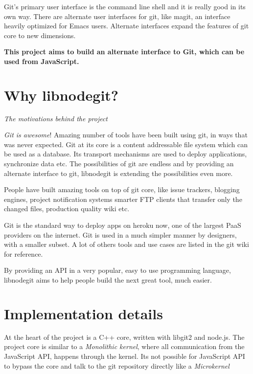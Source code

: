 Git's primary user interface is the command line shell and it is really good in
its own way. There are alternate user interfaces for git, like
magit\cite{magit}, an interface heavily optimized for Emacs\cite{emacs} users.
Alternate interfaces expand the features of git core to new dimensions.

\textbf{This project aims to build an alternate interface to Git, which can be
  used from JavaScript.}

\section{Why libnodegit?}

\newcommand\sectionTitle[1]{\begin{flushright}\textit{#1}\end{flushright}}
\sectionTitle{The motivations behind the project}

\textit{Git is awesome}! Amazing number of tools have been built using
git, in ways that was never expected. Git at its core is a content
addressable file system which can be used as a database. Its transport
mechanisms are used to deploy applications, synchronize data etc. The
possibilities of git are endless and by providing an alternate
interface to git, libnodegit is extending the possibilities even more.

People have built amazing tools on top of git core, like issue
trackers\cite{gaskit}, blogging engines\cite{octopress}, project
notification systems\cite{git-dude} smarter FTP clients\cite{git-ftp}
that transfer only the changed files, production
quality\cite{gollum-imporoved} wiki\cite{gollum} etc.

Git is the standard way to deploy apps on heroku\cite{git-heroku} now,
one of the largest PaaS\cite{PaaS} providers on the internet. Git is
used in a much simpler manner by designers\cite{git-designers}, with a
smaller subset. A lot of others tools and use cases are listed in the
git wiki\cite{git-tools} for reference.

By providing an API in a very popular, easy to use programming
language, libnodegit aims to help people build the next great tool,
much easier.

\section{Implementation details}

At the heart of the project is a C++ core, written with libgit2 and node.js. The
project core is similar to a \textit{Monolithic kernel}\cite{monolithic_kernel},
where all communication from the JavaScript API, happens through the kernel. Its
not possible for JavaScript API to bypass the core and talk to the git
repository directly like a \textit{Microkernel}\cite{microkernel}

